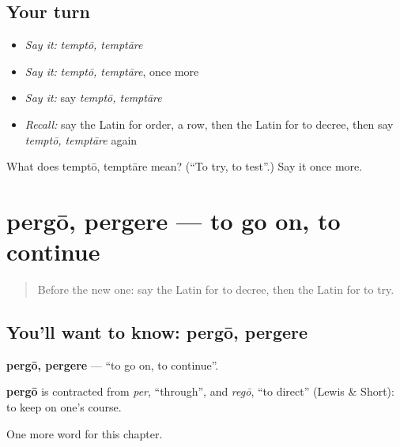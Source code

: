 \subsection*{Your turn}
\begin{itemize}
\raggedright
  \item \emph{Say it:} \emph{temptō, temptāre}
  \item \emph{Say it:} \emph{temptō, temptāre}, once more
  \item \emph{Say it:} say \emph{temptō, temptāre}
  \item \emph{Recall:} say the Latin for order, a row, then the Latin for to decree, then say \emph{temptō, temptāre} again
\end{itemize}

\begin{tcolorbox}[breakable,colback=teal!4,colframe=teal!35!black,title={Before you move on}]
What does temptō, temptāre mean? (\textquotedblleft{}To try, to test\textquotedblright{}.) Say it once more.
\end{tcolorbox}
\section[pergō, pergere]{pergō, pergere — to go on, to continue}

\label{lesson:LA-C229-pergo}



\begin{quote}
Before the new one: say the Latin for to decree, then the Latin for to try.
\end{quote}

\subsection*{You'll want to know: pergō, pergere}
\textbf{pergō, pergere} — \textquotedblleft{}to go on, to continue\textquotedblright{}.

\begin{cousinweb}
\textbf{pergō} is contracted from \emph{per}, \textquotedblleft{}through\textquotedblright{}, and \emph{regō}, \textquotedblleft{}to direct\textquotedblright{} (Lewis \& Short): to keep on one's course.
\end{cousinweb}

\begin{grammarlens}[title={What you've built}]
One more word for this chapter.
\end{grammarlens}

